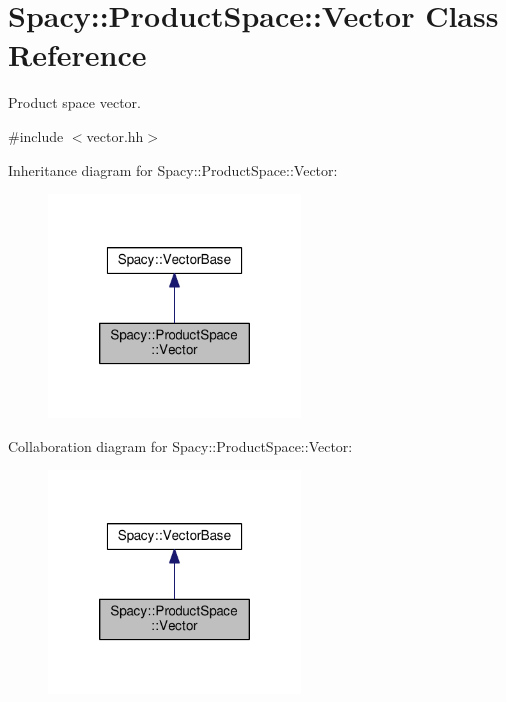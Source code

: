 \hypertarget{classSpacy_1_1ProductSpace_1_1Vector}{\section{Spacy\-:\-:Product\-Space\-:\-:Vector Class Reference}
\label{classSpacy_1_1ProductSpace_1_1Vector}
}


Product space vector.  




{\ttfamily \#include $<$vector.\-hh$>$}



Inheritance diagram for Spacy\-:\-:Product\-Space\-:\-:Vector\-:
\nopagebreak
\begin{figure}[H]
\begin{center}
\leavevmode
\includegraphics[width=190pt]{classSpacy_1_1ProductSpace_1_1Vector__inherit__graph}
\end{center}
\end{figure}


Collaboration diagram for Spacy\-:\-:Product\-Space\-:\-:Vector\-:
\nopagebreak
\begin{figure}[H]
\begin{center}
\leavevmode
\includegraphics[width=190pt]{classSpacy_1_1ProductSpace_1_1Vector__coll__graph}
\end{center}
\end{figure}
